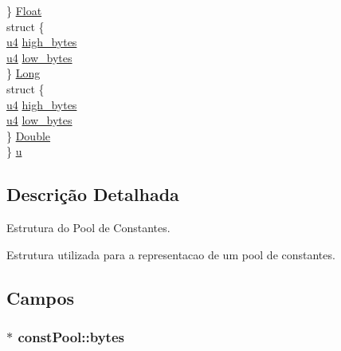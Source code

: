 \begin{DoxyCompactItemize}
\begin{tabbing}
\>\} \hyperlink{structconst_pool_aaba15c27d5b0f572a54d68643aa577fa}{Float}\\
\>struct \{\\
\>\>\hyperlink{estruturas_8h_aedf6ddc03df8caaaccbb4c60b9a9b850}{u4} \hyperlink{structconst_pool_a5c4154d878bdc78c47829c3003008bcd}{high\_bytes}\\
\>\>\hyperlink{estruturas_8h_aedf6ddc03df8caaaccbb4c60b9a9b850}{u4} \hyperlink{structconst_pool_a55d572db573fd39218d7e3233a7590fa}{low\_bytes}\\
\>\} \hyperlink{structconst_pool_a2ff4c34ed23a88cc0e355b0111ce8957}{Long}\\
\>struct \{\\
\>\>\hyperlink{estruturas_8h_aedf6ddc03df8caaaccbb4c60b9a9b850}{u4} \hyperlink{structconst_pool_a5c4154d878bdc78c47829c3003008bcd}{high\_bytes}\\
\>\>\hyperlink{estruturas_8h_aedf6ddc03df8caaaccbb4c60b9a9b850}{u4} \hyperlink{structconst_pool_a55d572db573fd39218d7e3233a7590fa}{low\_bytes}\\
\>\} \hyperlink{structconst_pool_a860c917cdbc43a11bbe5411a3329129a}{Double}\\
\} \hyperlink{structconst_pool_ab327fbd2fec182d523b180c4d941d7f5}{u}\\

\end{tabbing}\end{DoxyCompactItemize}


\subsection{Descrição Detalhada}
Estrutura do Pool de Constantes. 

Estrutura utilizada para a representacao de um pool de constantes. 

\subsection{Campos}
\subsubsection[{\texorpdfstring{bytes}{bytes}}]{$\ast$ const\+Pool\+::bytes}\hypertarget{structconst_pool_ae5e4f8056a2790c12bc61d9ba0582050}{}\label{structconst_pool_ae5e4f8056a2790c12bc61d9ba0582050}



